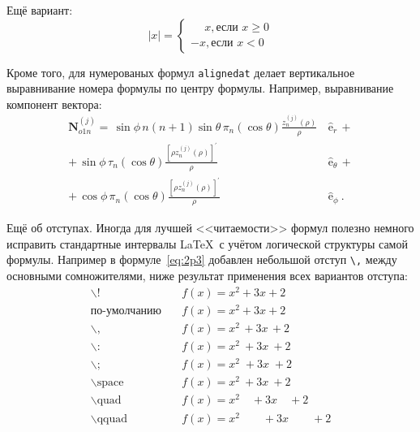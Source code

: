 Ещё вариант:
\[
    |x|=
    \begin{cases}
    \phantom{-}x, \text{если } x \geqslant 0 \\
    -x, \text{если } x<0
    \end{cases}
\]

Кроме того, для  нумерованых формул \verb|alignedat|  делает вертикальное
выравнивание номера формулы по центру формулы. Например,  выравнивание компонент вектора:
\begin{equation}
 \label{eq:2p3}
 \begin{alignedat}{2}
{\mathbf{N}}_{o1n}^{(j)} = \,{\sin} \phi\,n\!\left(n+1\right)
         {\sin}\theta\,
         \pi_n\!\left({\cos} \theta\right)
         \frac{
               z_n^{(j)}\!\left( \rho \right)
              }{\rho}\,
           &{\boldsymbol{\hat{\mathrm e}}}_{r}\,+   \\
+\,
{\sin} \phi\,
         \tau_n\!\left({\cos} \theta\right)
         \frac{
            \left[\rho z_n^{(j)}\!\left( \rho \right)\right]^{\prime}
              }{\rho}\,
            &{\boldsymbol{\hat{\mathrm e}}}_{\theta}\,+   \\
+\,
{\cos} \phi\,
         \pi_n\!\left({\cos} \theta\right)
         \frac{
            \left[\rho z_n^{(j)}\!\left( \rho \right)\right]^{\prime}
              }{\rho}\,
            &{\boldsymbol{\hat{\mathrm e}}}_{\phi}\:.
\end{alignedat}
\end{equation}

Ещё об отступах. Иногда для лучшей <<читаемости>> формул полезно
немного исправить стандартные интервалы \LaTeX\ с учётом логической
структуры самой формулы. Например в формуле~\ref{eq:2p3} добавлен
небольшой отступ \verb+\,+ между основными сомножителями, ниже
результат применения всех вариантов отступа:
\begin{align*}
\backslash! &\quad f(x) = x^2\! +3x\! +2 \\
  \mbox{по-умолчанию} &\quad f(x) = x^2+3x+2 \\
\backslash, &\quad f(x) = x^2\, +3x\, +2 \\
\backslash{:} &\quad f(x) = x^2\: +3x\: +2 \\
\backslash; &\quad f(x) = x^2\; +3x\; +2 \\
\backslash \mbox{space} &\quad f(x) = x^2\ +3x\ +2 \\
\backslash \mbox{quad} &\quad f(x) = x^2\quad +3x\quad +2 \\
\backslash \mbox{qquad} &\quad f(x) = x^2\qquad +3x\qquad +2
\end{align*}

